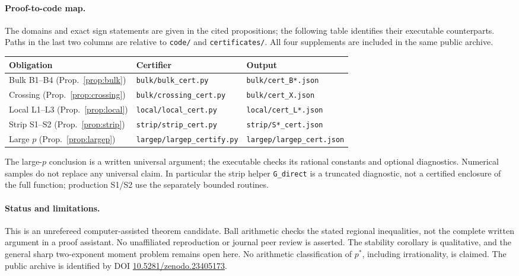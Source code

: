 \documentclass[11pt]{article}
\theoremstyle{remark}
\begin{document}
\paragraph{Proof-to-code map.}
The domains and exact sign statements are given in the cited propositions;
the following table identifies their executable counterparts. Paths in the
last two columns are relative to \texttt{code/} and \texttt{certificates/}.
All four supplements are included in the same public archive.
\begin{center}\small
\begin{tabular}{@{}lll@{}}
\toprule
Obligation & Certifier & Output \\
\midrule
Bulk B1--B4 (Prop.~\ref{prop:bulk}) & \texttt{bulk/bulk\_cert.py} & \texttt{bulk/cert\_B*.json}\\
Crossing (Prop.~\ref{prop:crossing}) & \texttt{bulk/crossing\_cert.py} & \texttt{bulk/cert\_X.json}\\
Local L1--L3 (Prop.~\ref{prop:local}) & \texttt{local/local\_cert.py} & \texttt{local/cert\_L*.json}\\
Strip S1--S2 (Prop.~\ref{prop:strip}) & \texttt{strip/strip\_cert.py} & \texttt{strip/S*\_cert.json}\\
Large $p$ (Prop.~\ref{prop:largep}) & \texttt{largep/largep\_certify.py} & \texttt{largep/largep\_cert.json}\\
\bottomrule
\end{tabular}
\end{center}
The large-$p$ conclusion is a written universal argument; the executable
checks its rational constants and optional diagnostics. Numerical samples do
not replace any universal claim. In particular the strip helper
\texttt{G\_direct} is a truncated diagnostic, not a certified enclosure of
the full function; production S1/S2 use the separately bounded routines.

\paragraph{Status and limitations.}
This is an unrefereed computer-assisted theorem candidate. Ball arithmetic
checks the stated regional inequalities, not the complete written argument
in a proof assistant. No unaffiliated reproduction or journal peer review is
asserted. The stability corollary is qualitative, and the general sharp
two-exponent moment problem remains open here. No arithmetic classification
of $p^*$, including irrationality, is claimed. The public archive is
identified by DOI \href{https://doi.org/10.5281/zenodo.23405173}{10.5281/zenodo.23405173}.
\end{document}
